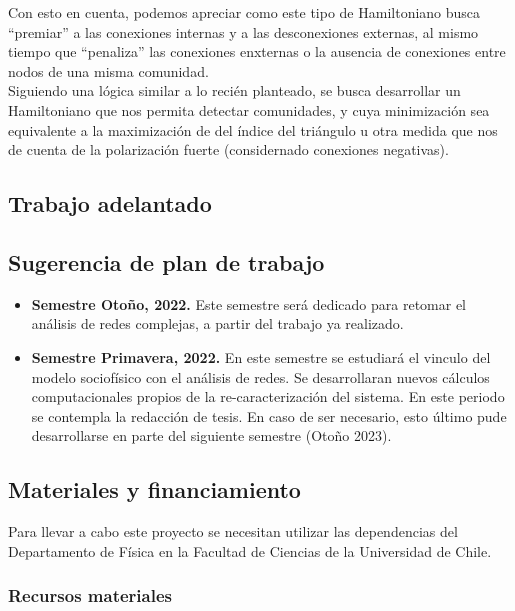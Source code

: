 \documentclass{proyectotesis}
\begin{document}
Con esto en cuenta, podemos apreciar como este tipo de Hamiltoniano busca ``premiar'' a las conexiones internas y a las desconexiones externas, al mismo tiempo que ``penaliza'' las conexiones enxternas o la ausencia de conexiones entre nodos de una misma comunidad.
\\

Siguiendo una lógica similar a lo recién planteado, se busca desarrollar un Hamiltoniano que nos permita detectar comunidades, y cuya minimización sea equivalente a la maximización de del índice del triángulo u otra medida que nos de cuenta de la polarización fuerte (considernado conexiones negativas).
\subsection{Trabajo adelantado}

\subsection{Sugerencia de plan de trabajo}
\begin{itemize}
\item \textbf{Semestre Otoño, 2022.} Este semestre será dedicado para retomar el análisis de redes complejas, a partir del trabajo ya realizado.  

\item \textbf{Semestre Primavera, 2022.} En este semestre se estudiará el vinculo del modelo sociofísico con el análisis de redes. Se desarrollaran nuevos cálculos computacionales propios de la re-caracterización del sistema. En este periodo se contempla la redacción de tesis. En caso de ser necesario, esto último pude desarrollarse en parte del siguiente semestre (Otoño 2023). 
\end{itemize}

\subsection{Materiales y financiamiento}

Para llevar a cabo este proyecto se necesitan utilizar las dependencias del Departamento de Física en la Facultad de Ciencias de la Universidad de Chile. %

\subsubsection*{Recursos materiales}
\end{document}
